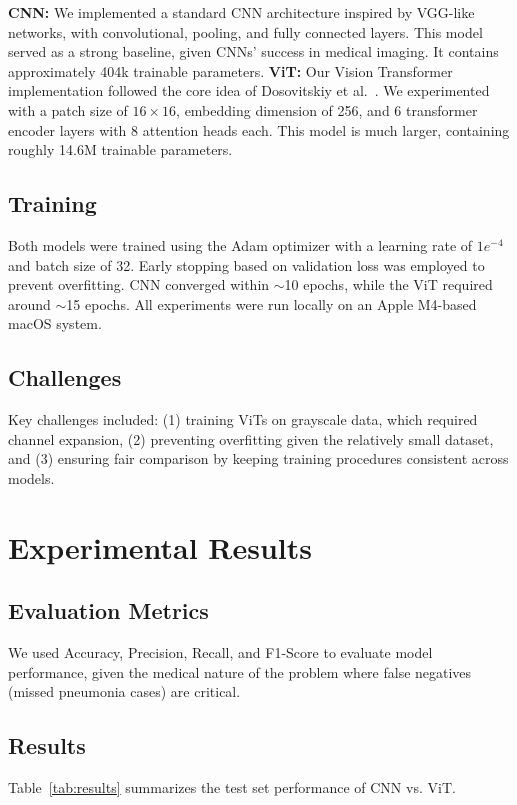 \documentclass{article}
\begin{document}
\textbf{CNN:} We implemented a standard CNN architecture inspired by VGG-like networks, with convolutional, pooling, and fully connected layers. This model served as a strong baseline, given CNNs' success in medical imaging. It contains approximately 404k trainable parameters.
\textbf{ViT:} Our Vision Transformer implementation followed the core idea of Dosovitskiy et al.~\cite{dosovitskiy2020image}. We experimented with a patch size of $16 \times 16$, embedding dimension of 256, and 6 transformer encoder layers with 8 attention heads each. This model is much larger, containing roughly 14.6M trainable parameters.

\subsection{Training}
Both models were trained using the Adam optimizer with a learning rate of $1e^{-4}$ and batch size of 32. Early stopping based on validation loss was employed to prevent overfitting. CNN converged within $\sim$10 epochs, while the ViT required around $\sim$15 epochs. All experiments were run locally on an Apple M4-based macOS system.

\subsection{Challenges}
Key challenges included: (1) training ViTs on grayscale data, which required channel expansion, (2) preventing overfitting given the relatively small dataset, and (3) ensuring fair comparison by keeping training procedures consistent across models.

\section{Experimental Results}

\subsection{Evaluation Metrics}
We used Accuracy, Precision, Recall, and F1-Score to evaluate model performance, given the medical nature of the problem where false negatives (missed pneumonia cases) are critical.

\subsection{Results}
Table~\ref{tab:results} summarizes the test set performance of CNN vs. ViT.
\end{document}
